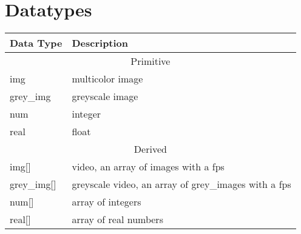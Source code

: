 \documentclass[a4paper, 11pt]{article}
\begin{document}
\section{Datatypes}
\begin{tabular}{ |p{3cm}||p{10cm}|  }
  \hline
  Data Type & Description\\
  \hline
  \multicolumn{2}{|c|}{Primitive} \\
  \hline
  img & multicolor image \\
  grey\_img & greyscale image \\
  num & integer\\
  real & float\\
  \hline
  \multicolumn{2}{|c|}{Derived} \\
  \hline
  img[] & video, an array of images with a fps\\
  grey\_img[] & greyscale video, an array of grey\_images with a fps\\
  num[] & array of integers\\
  real[] & array of real numbers\\
  \hline
 \end{tabular}
\end{document}
